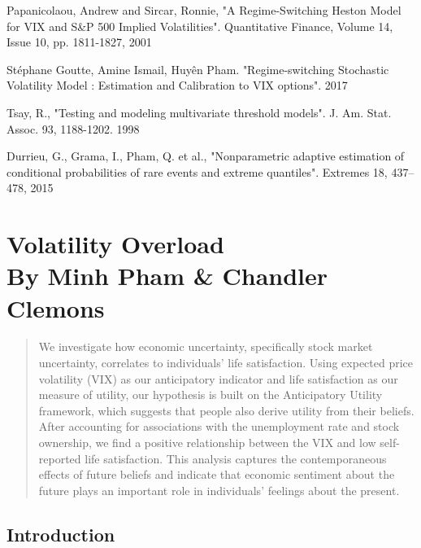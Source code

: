 \documentclass[11pt,a4paper,oldfontcommands]{memoir}
\begin{document}
{\begin{thebibliography}{39}
Papanicolaou, Andrew and Sircar, Ronnie, "A Regime-Switching Heston Model for VIX and S\&P 500 Implied Volatilities". Quantitative Finance, Volume 14, Issue 10, pp. 1811-1827, 2001 

Stéphane Goutte, Amine Ismail, Huyên Pham. "Regime-switching Stochastic Volatility Model : Estimation and Calibration to VIX options". 2017

Tsay, R., "Testing and modeling multivariate threshold models". J. Am. Stat. Assoc. 93, 1188-1202. 1998

Durrieu, G., Grama, I., Pham, Q. et al., "Nonparametric adaptive estimation of conditional probabilities of rare events and extreme quantiles". Extremes 18, 437–478, 2015 


\end{thebibliography}


\chapter{Volatility Overload  \\ \small By Minh Pham \& Chandler Clemons}


\begin{abstract}
    

We investigate how economic uncertainty, specifically stock market uncertainty, correlates to individuals’ life satisfaction. Using expected price volatility (VIX) as our anticipatory indicator and life satisfaction as our measure of utility, our hypothesis is built on the Anticipatory Utility framework, which suggests that people also derive utility from their beliefs. After accounting for associations with the unemployment rate and stock ownership, we find a positive relationship between the VIX and low self-reported life satisfaction. This analysis captures the contemporaneous effects of future beliefs and indicate that economic sentiment about the future plays an important role in individuals’ feelings about the present.

\end{abstract}

\clearpage

\section{Introduction}

}
\end{document}
